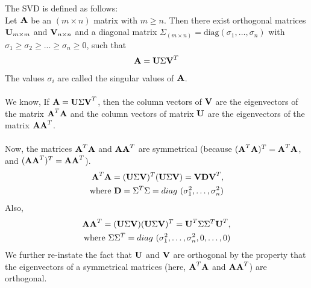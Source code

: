 \documentclass[12pt, a4paper]{article}
\begin{document}
The SVD is defined as follows: \\ Let $\textbf{A}$ be an $(m \times n)$ matrix with $m \geq n$.
Then there exist orthogonal matrices $\textbf{U}_{m \times m}$ and $\textbf{V}_{n \times n}$ and a diagonal matrix $\Sigma_{(m \times n)} = \text{diag} (\sigma_1, \ldots , \sigma_n)$ with $\sigma_1 \geq \sigma_2 \geq . . . \geq \sigma_n \geq 0$, such that
\begin{align*}
    \textbf{A} = \textbf{U} \Sigma \textbf{V}^T
\end{align*}
The values $\sigma_i$ are called the singular values of $\textbf{A}$. \\ \\
We know, If $\textbf{A} = \textbf{U}\Sigma\textbf{V}^T$, then the column vectors of $\textbf{V}$ are the eigenvectors of the matrix $\textbf{A}^T\textbf{A}$ and the column vectors of matrix $\textbf{U}$ are the eigenvectors of the matrix $\textbf{A}\textbf{A}^T$.\\ \\
Now, the matrices $\textbf{A}^T\textbf{A}$ and $\textbf{A}\textbf{A}^T$ are symmetrical (because $(\textbf{A}^T\textbf{A})^T = \textbf{A}^T\textbf{A}$, and $(\textbf{A}\textbf{A}^T)^T = \textbf{A}\textbf{A}^T$).
\begin{align*}
    \textbf{A}^T\textbf{A} = (\textbf{U}\Sigma\textbf{V})^T(\textbf{U}\Sigma\textbf{V}) = \textbf{V}\textbf{D}\textbf{V}^T, \\
    \text{where $\textbf{D} = \Sigma^T \Sigma = diag$ $(\sigma_1^2, \ldots , \sigma_n^2)$} 
\end{align*}
Also,
\begin{align*}
    \textbf{A}\textbf{A}^T = (\textbf{U}\Sigma\textbf{V})(\textbf{U}\Sigma\textbf{V})^T = \textbf{U}^T\Sigma\Sigma^T\textbf{U}^T, \\
    \text{where $\Sigma\Sigma^T = diag$ $(\sigma_1^2, \ldots , \sigma_n^2, 0, \ldots, 0)$} 
\end{align*}
We further re-instate the fact that $\textbf{U}$ and $\textbf{V}$ are orthogonal by the property that the eigenvectors of a symmetrical matrices (here, $\textbf{A}^T\textbf{A}$ and $\textbf{A}\textbf{A}^T$) are orthogonal. \\ \\
\end{document}
